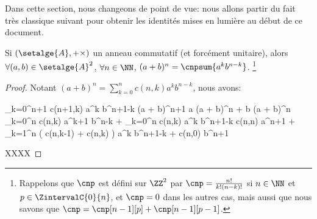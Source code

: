 Dans cette section, nous changeons de point de vue: nous allons partir du fait très classique suivant pour obtenir les identités mises en lumière au début de ce document.




\begin{fact} \label{bino-id}
	Si $(\setalge{A}, + \times)$ un anneau commutatif (et forcément unitaire),
	alors
	$\forall (a, b) \in \setalge{A}^2$,
	$\forall n \in \NN$,
	$(a + b)^n = \cnpsum{a^k b^{n-k}}$.%
	\footnote{
        Rappelons que $\cnp$ est défini sur $\ZZ^2$ par
        $\cnp = \frac{n!}{k!(n-k)!}$ si $n \in \NN$ et $p \in \ZintervalC{0}{n}$,
        et
        $\cnp = 0$ dans les autres cas,
        mais aussi que nous savons que $\cnp = \cnp[n-1][p] + \cnp[n-1][p-1]$.
	}
\end{fact}


\begin{proof}
    Notant $(a + b)^n = \sum_{k=0}^{n} c(n,k) a^k b^{n-k}$, nous avons:
    
    \begin{stepcalc}[style=ar*]
    	\dsum_{k=0}^{n+1} c(n+1,k) a^k b^{n+1-k}
	\explnext{}
    	(a + b)^{n+1}
	\explnext{}
    	a (a + b)^n + b (a + b)^n
	\explnext{}
    	  \dsum_{k=0}^{n} c(n,k) a^{k+1} b^{n-k}
		+ \dsum_{k=0}^{n} c(n,k) a^k b^{n+1-k}
	\explnext{}
    	  c(n,n) a^{n+1}
		+ \dsum_{k=1}^{n} \big( c(n,k-1) + c(n,k) \big) a^k b^{n+1-k}
		+ c(n,0) b^{n+1}
    \end{stepcalc}
    

	XXXX
\end{proof}
